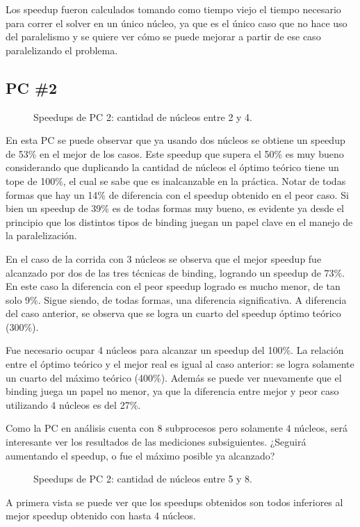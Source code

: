 \documentclass{article}
\begin{document}
Los speedup fueron calculados tomando como tiempo viejo el tiempo necesario para correr el solver en un único núcleo, ya que es el único caso que no hace uso del paralelismo y se quiere ver cómo se puede mejorar a partir de ese caso paralelizando el problema.

\subsection{PC \#2}
\begin{figure}[h!]
    
    \caption{Speedups de PC 2: cantidad de núcleos entre 2 y 4.}
\end{figure}
En esta PC se puede observar que ya usando dos núcleos se obtiene un speedup de 53\% en el mejor de los casos. Este speedup que supera el 50\% es muy bueno considerando que duplicando la cantidad de núcleos el óptimo teórico tiene un tope de 100\%, el cual se sabe que es inalcanzable en la práctica. Notar de todas formas que hay un 14\% de diferencia con el speedup obtenido en el peor caso. Si bien un speedup de 39\% es de todas formas muy bueno, es evidente ya desde el principio que los distintos tipos de binding juegan un papel clave en el manejo de la paralelización. 

En el caso de la corrida con 3 núcleos se observa que el mejor speedup fue alcanzado por dos de las tres técnicas de binding, logrando un speedup de 73\%. En este caso la diferencia con el peor speedup logrado es mucho menor, de tan solo 9\%. Sigue siendo, de todas formas, una diferencia significativa. A diferencia del caso anterior, se observa que se logra un cuarto del speedup óptimo teórico (300\%).

Fue necesario ocupar 4 núcleos para alcanzar un speedup del 100\%. La relación entre el óptimo teórico y el mejor real es igual al caso anterior: se logra solamente un cuarto del máximo teórico (400\%). Además se puede ver nuevamente que el binding juega un papel no menor, ya que la diferencia entre mejor y peor caso utilizando 4 núcleos es del 27\%. 

Como la PC en análisis cuenta con 8 subprocesos pero solamente 4 núcleos, será interesante ver los resultados de las mediciones subsiguientes. ¿Seguirá aumentando el speedup, o fue el máximo posible ya alcanzado?

\begin{figure}[h!]
    
    \caption{Speedups de PC 2: cantidad de núcleos entre 5 y 8.}
\end{figure}
A primera vista se puede ver que los speedups obtenidos son todos inferiores al mejor speedup obtenido con hasta 4 núcleos.
\end{document}
